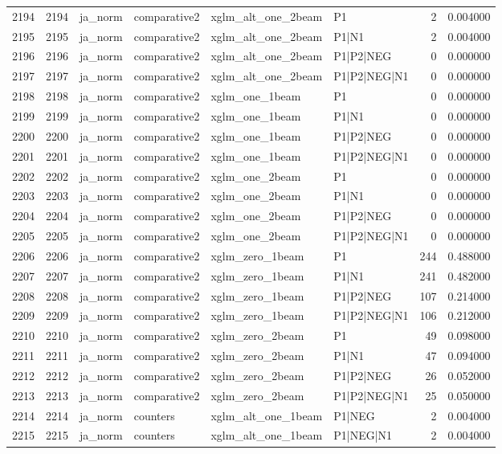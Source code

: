 \begin{tabular}{lrllllrr}
2194 & 2194 & ja_norm & comparative2 & xglm_alt_one_2beam & P1 & 2 & 0.004000 \\
2195 & 2195 & ja_norm & comparative2 & xglm_alt_one_2beam & P1|N1 & 2 & 0.004000 \\
2196 & 2196 & ja_norm & comparative2 & xglm_alt_one_2beam & P1|P2|NEG & 0 & 0.000000 \\
2197 & 2197 & ja_norm & comparative2 & xglm_alt_one_2beam & P1|P2|NEG|N1 & 0 & 0.000000 \\
2198 & 2198 & ja_norm & comparative2 & xglm_one_1beam & P1 & 0 & 0.000000 \\
2199 & 2199 & ja_norm & comparative2 & xglm_one_1beam & P1|N1 & 0 & 0.000000 \\
2200 & 2200 & ja_norm & comparative2 & xglm_one_1beam & P1|P2|NEG & 0 & 0.000000 \\
2201 & 2201 & ja_norm & comparative2 & xglm_one_1beam & P1|P2|NEG|N1 & 0 & 0.000000 \\
2202 & 2202 & ja_norm & comparative2 & xglm_one_2beam & P1 & 0 & 0.000000 \\
2203 & 2203 & ja_norm & comparative2 & xglm_one_2beam & P1|N1 & 0 & 0.000000 \\
2204 & 2204 & ja_norm & comparative2 & xglm_one_2beam & P1|P2|NEG & 0 & 0.000000 \\
2205 & 2205 & ja_norm & comparative2 & xglm_one_2beam & P1|P2|NEG|N1 & 0 & 0.000000 \\
2206 & 2206 & ja_norm & comparative2 & xglm_zero_1beam & P1 & 244 & 0.488000 \\
2207 & 2207 & ja_norm & comparative2 & xglm_zero_1beam & P1|N1 & 241 & 0.482000 \\
2208 & 2208 & ja_norm & comparative2 & xglm_zero_1beam & P1|P2|NEG & 107 & 0.214000 \\
2209 & 2209 & ja_norm & comparative2 & xglm_zero_1beam & P1|P2|NEG|N1 & 106 & 0.212000 \\
2210 & 2210 & ja_norm & comparative2 & xglm_zero_2beam & P1 & 49 & 0.098000 \\
2211 & 2211 & ja_norm & comparative2 & xglm_zero_2beam & P1|N1 & 47 & 0.094000 \\
2212 & 2212 & ja_norm & comparative2 & xglm_zero_2beam & P1|P2|NEG & 26 & 0.052000 \\
2213 & 2213 & ja_norm & comparative2 & xglm_zero_2beam & P1|P2|NEG|N1 & 25 & 0.050000 \\
2214 & 2214 & ja_norm & counters & xglm_alt_one_1beam & P1|NEG & 2 & 0.004000 \\
2215 & 2215 & ja_norm & counters & xglm_alt_one_1beam & P1|NEG|N1 & 2 & 0.004000 \\

\end{tabular}
